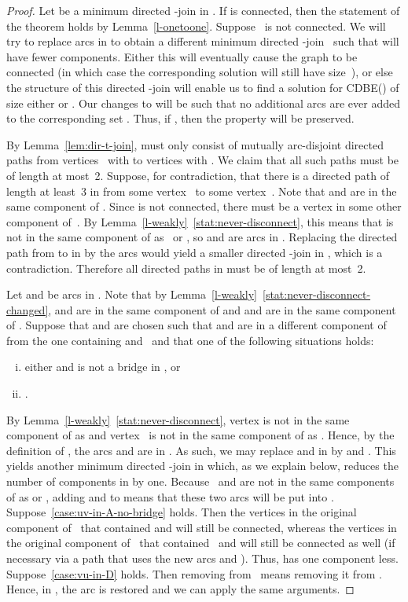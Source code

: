 \documentclass[11pt]{llncs}
\newcommand{\cdbe}{{\sc CDBE}}
\begin{document}
\begin{proof}
Let  be a minimum directed -join in . If  is connected,
then the statement of the theorem holds by Lemma~\ref{l-onetoone}.  Suppose~
is not connected.  We will try to replace arcs in  to obtain a different
minimum directed -join~ such that  will have fewer
components. Either this will eventually cause the graph to be connected (in
which case the corresponding solution will still have size~), or else the
structure of this directed -join will enable us to find a solution for
\cdbe() of size either  or . Our changes to  will
be such that no additional arcs are ever added to the corresponding set .
Thus, if , then the property  will be preserved.

By Lemma~\ref{lem:dir-t-join},  must only consist of mutually
arc-disjoint directed paths from vertices~ with  to vertices 
with . We claim that all such paths must be of length at most~2.
Suppose, for contradiction, that there is a directed path of length at least~3
in  from some vertex~ to some vertex~. Note that  and  are
in the same component of . Since  is not  connected, there must be a
vertex  in some other component of~. By Lemma~\ref{l-weakly}~\ref{stat:never-disconnect}, this
means that  is not in the same component of  as~ or , so 
and  are arcs in .  Replacing the directed path from  to  in
 by the arcs  would yield a smaller directed -join in ,
which is a contradiction.  Therefore all directed paths in  must be of
length at most~2. 

Let  and  be arcs in .  Note that by
Lemma~\ref{l-weakly}~\ref{stat:never-disconnect-changed},  and  are in the same component of  and
 and  are in the same component of .  Suppose that  and
 are chosen such that  and  are in a different component of 
from the one containing   and~ and that one of the following situations
holds:
\begin{enumerate}[(i)]
\renewcommand{\theenumi}{(\roman{enumi})}
\renewcommand\labelenumi{\theenumi}
\item \label{case:uv-in-A-no-bridge} either  and  is not a bridge in , or
\item \label{case:vu-in-D} .
\end{enumerate}
By Lemma~\ref{l-weakly}~\ref{stat:never-disconnect}, vertex  is not in the same component of  as
 and vertex~ is not in the same component of  as . Hence, by the
definition of , the arcs  and  are in .  As such, we
may replace  and  in  by  and . This yields
another minimum directed -join in  which, as we explain below, reduces
the number of components in  by one.  Because~ and  are not in the
same components of  as  or , adding  and   to 
means that these two arcs will be put into .  Suppose~\ref{case:uv-in-A-no-bridge} holds. Then the
vertices in the original component of~ that contained  and  will still
be connected, whereas the vertices in the original component of~ that
contained~ and  will still be connected as well (if necessary via a path
that uses the new arcs  and ). Thus,  has one component
less.  Suppose~\ref{case:vu-in-D} holds.  Then removing  from~ means removing it
from . Hence, in , the arc  is restored and we can apply the
same arguments.


\end{proof}
\end{document}
